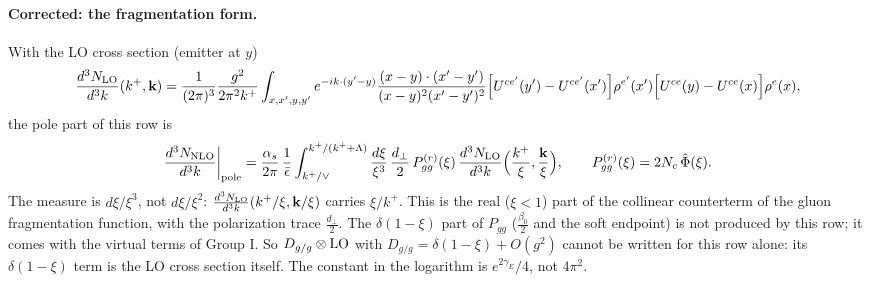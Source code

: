 \documentclass[9pt]{article}
\numberwithin{equation}{section}
\begin{document}
{\paragraph{Corrected: the fragmentation form.} With the LO cross section (emitter at $y$)
\begin{align}
\frac{d^{3}N_{\rm LO}}{d^{3}k}(k^{+},\mathbf k)=\frac{1}{(2\pi)^{3}}\frac{g^{2}}{2\pi^{2}k^{+}}\int_{x,x',y,y'}e^{-ik\cdot(y'-y)}\frac{(x-y)\cdot(x'-y')}{(x-y)^{2}(x'-y')^{2}}\Big[U^{ce'}(y')-U^{ce'}(x')\Big]\rho^{e'}(x')\Big[U^{ce}(y)-U^{ce}(x)\Big]\rho^{e}(x),
\end{align}
the pole part of this row is
\begin{align}
\frac{d^{3}N_{\rm NLO}}{d^{3}k}\bigg|_{\rm pole}=\frac{\alpha_{s}}{2\pi}\,\frac{1}{\bar\epsilon}\int_{k^{+}/\vee}^{k^{+}/(k^{+}+\Lambda)}\frac{d\xi}{\xi^{3}}\,\frac{d_\perp}{2}\,P^{(r)}_{gg}(\xi)\,\frac{d^{3}N_{\rm LO}}{d^{3}k}\Big(\frac{k^{+}}{\xi},\frac{\mathbf k}{\xi}\Big),\qquad P^{(r)}_{gg}(\xi)=2N_{c}\,\hat\Phi(\xi).
\end{align}
The measure is $d\xi/\xi^{3}$, not $d\xi/\xi^{2}$: $\frac{d^{3}N_{\rm LO}}{d^{3}k}(k^{+}/\xi,\mathbf k/\xi)$ carries $\xi/k^{+}$. This is the real ($\xi<1$) part of the collinear counterterm of the gluon fragmentation function, with the polarization trace $\frac{d_\perp}{2}$. The $\delta(1-\xi)$ part of $P_{gg}$ ($\frac{\beta_0}{2}$ and the soft endpoint) is not produced by this row; it comes with the virtual terms of Group I. So $D_{g/g}\otimes{\rm LO}$ with $D_{g/g}=\delta(1-\xi)+O(g^{2})$ cannot be written for this row alone: its $\delta(1-\xi)$ term is the LO cross section itself. The constant in the logarithm is $e^{2\gamma_{E}}/4$, not $4\pi^{2}$.
}
\end{document}
